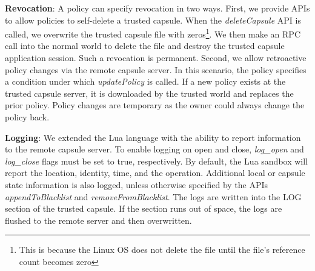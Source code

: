 \textbf{Revocation}: A policy can specify revocation in two
ways. First, we provide APIs to allow policies to self-delete a trusted
capsule. When the \textit{deleteCapsule} API is called, we overwrite
the trusted capsule file with zeros\footnote{This is because the Linux OS does not
    delete the file until the file's reference count becomes zero}. We then
make an RPC call into the normal world to delete the file and destroy the
trusted capsule application session. Such a revocation is permanent.  Second, we
allow retroactive policy changes via the remote capsule server. In this
scenario, the policy specifies a condition under which \textit{updatePolicy} is
called. If a new policy exists at the trusted capsule server, it is downloaded
by the trusted world and replaces the prior policy. Policy changes are temporary as the owner
could always change the policy back. %

\textbf{Logging}: We extended the Lua language with the ability to report
information to the remote capsule server. To enable logging on open and close, \textit{log\_open}
and \textit{log\_close} flags must be set to true, respectively.
By default, the Lua sandbox will report the location,
identity, time, and the operation. Additional local or capsule state information is
also logged, unless otherwise specified by the APIs \textit{appendToBlacklist}
and \textit{removeFromBlacklist}. The logs are written into the LOG section of
the trusted capsule.  If the section runs out of space, the logs are flushed to
the remote server and then overwritten. %


